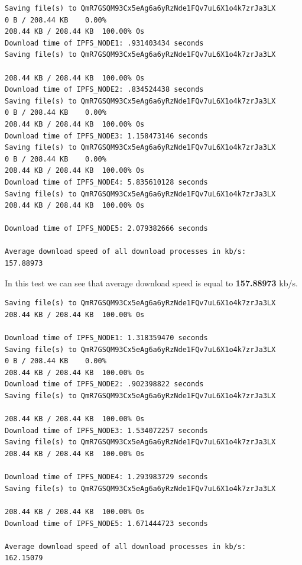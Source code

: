 \documentclass[a4paper,12pt,fleqn]{article}
\begin{document}
\newpage
\begin{lstlisting}[caption={Download test with delay which is equal to 5 seconds.},label={abc}]
Saving file(s) to QmR7GSQM93Cx5eAg6a6yRzNde1FQv7uL6X1o4k7zrJa3LX
0 B / 208.44 KB    0.00%
208.44 KB / 208.44 KB  100.00% 0s
Download time of IPFS_NODE1: .931403434 seconds
Saving file(s) to QmR7GSQM93Cx5eAg6a6yRzNde1FQv7uL6X1o4k7zrJa3LX

208.44 KB / 208.44 KB  100.00% 0s
Download time of IPFS_NODE2: .834524438 seconds
Saving file(s) to QmR7GSQM93Cx5eAg6a6yRzNde1FQv7uL6X1o4k7zrJa3LX
0 B / 208.44 KB    0.00%
208.44 KB / 208.44 KB  100.00% 0s
Download time of IPFS_NODE3: 1.158473146 seconds
Saving file(s) to QmR7GSQM93Cx5eAg6a6yRzNde1FQv7uL6X1o4k7zrJa3LX
0 B / 208.44 KB    0.00%
208.44 KB / 208.44 KB  100.00% 0s
Download time of IPFS_NODE4: 5.835610128 seconds
Saving file(s) to QmR7GSQM93Cx5eAg6a6yRzNde1FQv7uL6X1o4k7zrJa3LX
208.44 KB / 208.44 KB  100.00% 0s

Download time of IPFS_NODE5: 2.079382666 seconds

Average download speed of all download processes in kb/s:
157.88973
\end{lstlisting}    

In this test we can see that average download speed is equal to \textbf{157.88973} kb/s.

\begin{lstlisting}[caption={Downlaod test with delay which is equal to 10 seconds.},label={abc}]
Saving file(s) to QmR7GSQM93Cx5eAg6a6yRzNde1FQv7uL6X1o4k7zrJa3LX
208.44 KB / 208.44 KB  100.00% 0s

Download time of IPFS_NODE1: 1.318359470 seconds
Saving file(s) to QmR7GSQM93Cx5eAg6a6yRzNde1FQv7uL6X1o4k7zrJa3LX
0 B / 208.44 KB    0.00%
208.44 KB / 208.44 KB  100.00% 0s
Download time of IPFS_NODE2: .902398822 seconds
Saving file(s) to QmR7GSQM93Cx5eAg6a6yRzNde1FQv7uL6X1o4k7zrJa3LX

208.44 KB / 208.44 KB  100.00% 0s
Download time of IPFS_NODE3: 1.534072257 seconds
Saving file(s) to QmR7GSQM93Cx5eAg6a6yRzNde1FQv7uL6X1o4k7zrJa3LX
208.44 KB / 208.44 KB  100.00% 0s

Download time of IPFS_NODE4: 1.293983729 seconds
Saving file(s) to QmR7GSQM93Cx5eAg6a6yRzNde1FQv7uL6X1o4k7zrJa3LX

208.44 KB / 208.44 KB  100.00% 0s
Download time of IPFS_NODE5: 1.671444723 seconds

Average download speed of all download processes in kb/s:
162.15079
\end{lstlisting}    
\end{document}
